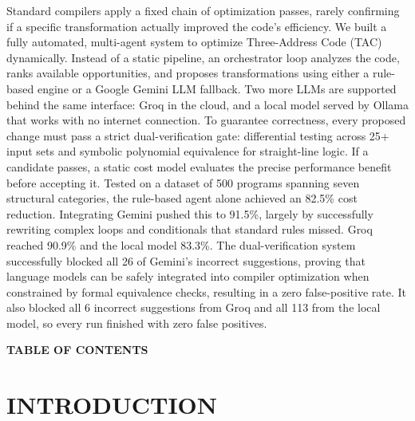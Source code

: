 \documentclass[12pt,a4paper]{report}
\begin{document}
Standard compilers apply a fixed chain of optimization passes, rarely confirming if a specific transformation actually improved the code's efficiency. We built a fully automated, multi-agent system to optimize Three-Address Code (TAC) dynamically. Instead of a static pipeline, an orchestrator loop analyzes the code, ranks available opportunities, and proposes transformations using either a rule-based engine or a Google Gemini LLM fallback. Two more LLMs are supported behind the same interface: Groq in the cloud, and a local model served by Ollama that works with no internet connection. To guarantee correctness, every proposed change must pass a strict dual-verification gate: differential testing across 25+ input sets and symbolic polynomial equivalence for straight-line logic. If a candidate passes, a static cost model evaluates the precise performance benefit before accepting it. Tested on a dataset of 500 programs spanning seven structural categories, the rule-based agent alone achieved an 82.5\% cost reduction. Integrating Gemini pushed this to 91.5\%, largely by successfully rewriting complex loops and conditionals that standard rules missed. Groq reached 90.9\% and the local model 83.3\%. The dual-verification system successfully blocked all 26 of Gemini's incorrect suggestions, proving that language models can be safely integrated into compiler optimization when constrained by formal equivalence checks, resulting in a zero false-positive rate. It also blocked all 6 incorrect suggestions from Groq and all 113 from the local model, so every run finished with zero false positives.

\newpage

\begin{center}
{\fontsize{16}{20}\selectfont \textbf{TABLE OF CONTENTS}}
\end{center}
\vspace{0.5cm}

\renewcommand{\contentsname}{}
\begingroup
\let\clearpage\relax
\vspace*{-2.5cm}
\tableofcontents
\endgroup
\newpage

\chapter{INTRODUCTION}
\end{document}
